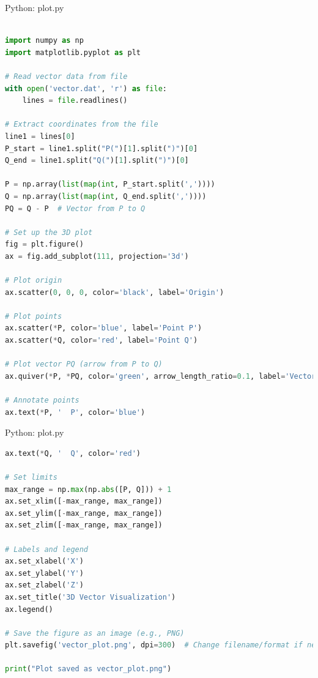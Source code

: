 \documentclass{beamer}
\numberwithin{equation}{section}
\theoremstyle{remark}
\begin{document}
\begin{frame}[fragile]{Python: plot.py}
\begin{lstlisting}[language=Python]

import numpy as np
import matplotlib.pyplot as plt

# Read vector data from file
with open('vector.dat', 'r') as file:
    lines = file.readlines()

# Extract coordinates from the file
line1 = lines[0]
P_start = line1.split("P(")[1].split(")")[0]
Q_end = line1.split("Q(")[1].split(")")[0]

P = np.array(list(map(int, P_start.split(','))))
Q = np.array(list(map(int, Q_end.split(','))))
PQ = Q - P  # Vector from P to Q

# Set up the 3D plot
fig = plt.figure()
ax = fig.add_subplot(111, projection='3d')

# Plot origin
ax.scatter(0, 0, 0, color='black', label='Origin')

# Plot points
ax.scatter(*P, color='blue', label='Point P')
ax.scatter(*Q, color='red', label='Point Q')

# Plot vector PQ (arrow from P to Q)
ax.quiver(*P, *PQ, color='green', arrow_length_ratio=0.1, label='Vector PQ')

# Annotate points
ax.text(*P, '  P', color='blue')
\end{lstlisting}
\end{frame}

\begin{frame}[fragile]{Python: plot.py}
\begin{lstlisting}[language=Python]
ax.text(*Q, '  Q', color='red')

# Set limits
max_range = np.max(np.abs([P, Q])) + 1
ax.set_xlim([-max_range, max_range])
ax.set_ylim([-max_range, max_range])
ax.set_zlim([-max_range, max_range])

# Labels and legend
ax.set_xlabel('X')
ax.set_ylabel('Y')
ax.set_zlabel('Z')
ax.set_title('3D Vector Visualization')
ax.legend()

# Save the figure as an image (e.g., PNG)
plt.savefig('vector_plot.png', dpi=300)  # Change filename/format if needed

print("Plot saved as vector_plot.png")
\end{lstlisting}
\end{frame}
\end{document}

